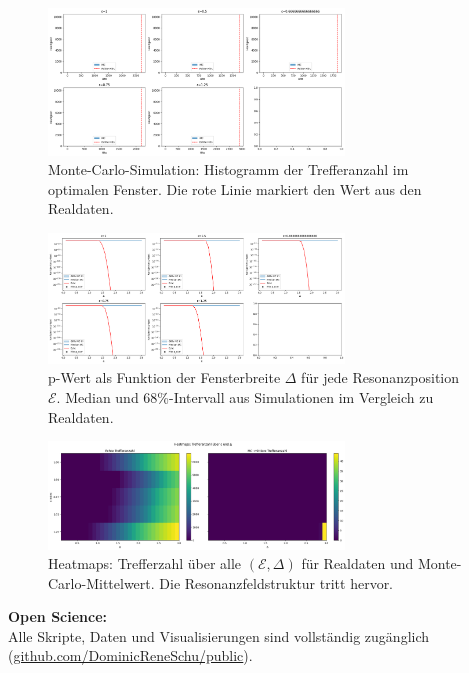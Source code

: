 \documentclass[12pt]{article}
\begin{document}
\begin{figure}[ht]
	\centering
	\includegraphics[width=0.7\textwidth]{figures/hist_mc_vs_real_hits.png}
	\caption{Monte-Carlo-Simulation: Histogramm der Trefferanzahl im optimalen Fenster. Die rote Linie markiert den Wert aus den Realdaten.}
	\label{fig:mc_results_hist}
\end{figure}

\begin{figure}[ht]
	\centering
	\includegraphics[width=0.7\textwidth]{figures/pvalue_curves.png}
	\caption{p-Wert als Funktion der Fensterbreite $\Delta$ für jede Resonanzposition $\mathcal{E}$. Median und 68\%-Intervall aus Simulationen im Vergleich zu Realdaten.}
	\label{fig:mc_results_pvalue}
\end{figure}

\begin{figure}[ht]
	\centering
	\includegraphics[width=0.7\textwidth]{figures/heatmaps_hits.png}
	\caption{Heatmaps: Trefferzahl über alle $(\mathcal{E}, \Delta)$ für Realdaten und Monte-Carlo-Mittelwert. Die Resonanzfeldstruktur tritt hervor.}
	\label{fig:mc_results_heatmap}
\end{figure}

\textbf{Open Science:}\\
Alle Skripte, Daten und Visualisierungen sind vollständig zugänglich (\href{https://github.com/DominicReneSchu/public/tree/main/fakten/empirisch/monte_carlo_test}{github.com/DominicReneSchu/public}).
\end{document}
